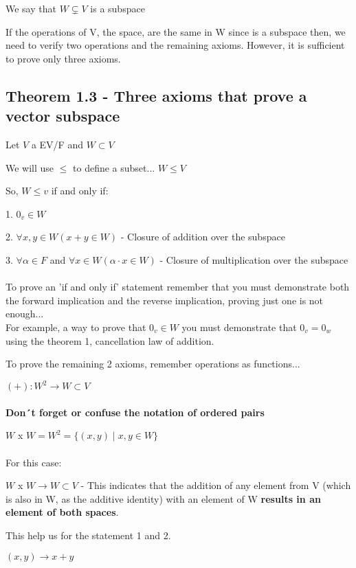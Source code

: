 \documentclass{article}
\begin{document}
We say that \(W \subsetneq V\) is a subspace

If the operations of V, the space, are the same in W since is a subspace then, we need to verify two operations and the remaining axioms. However, it is sufficient to prove only three axioms.

\subsection*{Theorem 1.3 - Three axioms that prove a vector subspace}

Let \(V\) a EV/F and \(W \subset V\)

We will use \(\leq\) to define a subset... \(W\leq V\)

So, \(W \leq v \) if and only if:

1. \(0_v \in W\)

2. \(\forall x,y \in W ( x+ y \in W)\) - Closure of addition over the subspace

3. \(\forall \alpha \in F\) and \(\forall x \in W (\alpha \cdot x \in W)\) - Closure of multiplication over the subspace
\\
\\
To prove an 'if and only if' statement remember that you must demonstrate both the forward implication and the reverse implication, proving just one is not enough...
\\

For example, a way to prove that \(0_v \in W\) you must demonstrate that \(0_v = 0_w\) using the theorem 1, cancellation law of addition.

To prove the remaining 2 axioms, remember operations as functions...

\((+) : W^2 \rightarrow W \subset V\)
\\
\\
\textbf{Don´t forget or confuse the notation of ordered pairs}

\(W\) x \(W = W^2 = \{ (x,y)\;|\; x, y \in W\}\)
\\
\\
For this case:

\(W\) x \(W \rightarrow W \subset V\) - This indicates that the addition of any element from V (which is also in W, as the additive identity) with an element of W \textbf{results in an element of both spaces}.

This help us for the statement 1 and 2.

\((x,y) \rightarrow x+y\)
\\
\end{document}
